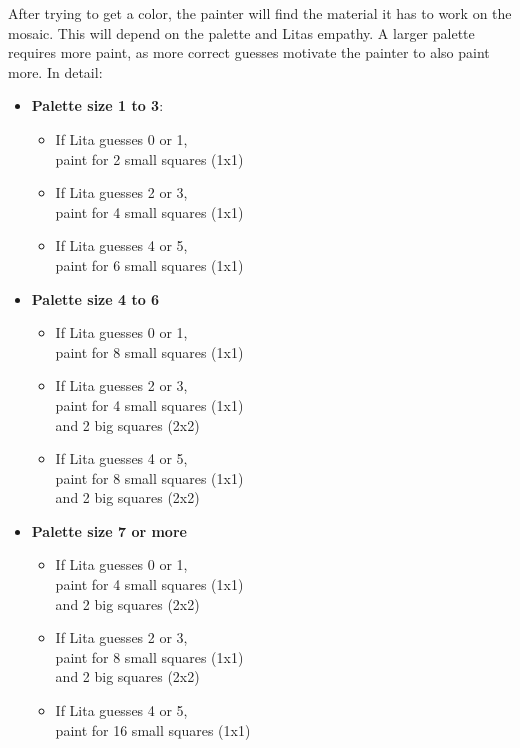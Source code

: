 \documentclass[twocolumn]{article}
\begin{document}
After trying to get a color, the painter will find the material it has to work on the mosaic. This will depend on the palette and Litas empathy. A larger palette requires more paint, as more correct guesses motivate the painter to also paint more. In detail: 
\begin{itemize}
    \item \textbf{Palette size 1 to 3}:
    \begin{itemize}
        \item If Lita guesses 0 or 1, \\paint for 2 small squares (1x1)
        \item If Lita guesses 2 or 3, \\paint for 4 small squares (1x1)
        \item If Lita guesses 4 or 5, \\paint for 6 small squares (1x1)
    \end{itemize}
    \item \textbf{Palette size 4 to 6}
    \begin{itemize}
        \item If Lita guesses 0 or 1, \\paint for 8 small squares (1x1)
        \item If Lita guesses 2 or 3, \\paint for 4 small squares (1x1) \\and 2 big squares (2x2)
        \item If Lita guesses 4 or 5, \\paint for 8 small squares (1x1) \\and 2 big squares (2x2)
    \end{itemize}
    \item \textbf{Palette size 7 or more}
    \begin{itemize}
        \item If Lita guesses 0 or 1, \\paint for 4 small squares (1x1) \\and 2 big squares (2x2)
        \item If Lita guesses 2 or 3, \\paint for 8 small squares (1x1) \\and 2 big squares (2x2)
        \item If Lita guesses 4 or 5, \\paint for 16 small squares (1x1)
    \end{itemize}
\end{itemize}
\end{document}
